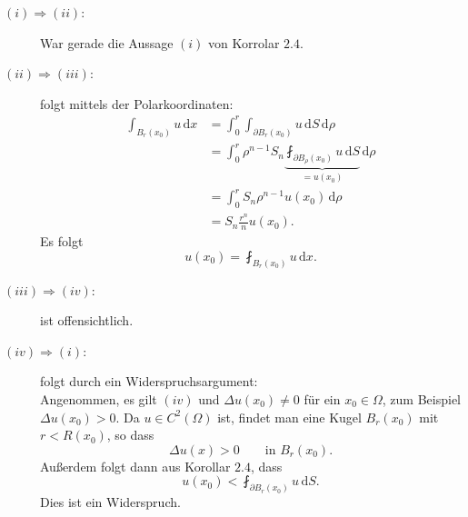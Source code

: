 \begin{beweis}
	\begin{description}
		\item[\underline{$(i) \Rightarrow (ii)$}:] War gerade die Aussage $(i)$ von Korrolar $2.4$.
		\item[\underline{$(ii) \Rightarrow (iii)$}:] folgt mittels der Polarkoordinaten:
		\begin{align*}
			\int_{B_r(x_0)}^{}u \,\mathrm{d}x &= \int_{0}^{r} \int_{\partial B_r(x_0)}^{} u \,\mathrm{d}S \,\mathrm{d}\rho  \\
			&= \int_{0}^{r} \rho^{n-1}S_n \underset{=u(x_0)}{\underbrace{\fint_{\partial B_{\rho}(x_0)}^{} u \,\mathrm{d}S}} \,\mathrm{d} \rho \\
			&= \int_{0}^{r}S_n \rho^{n-1} u(x_0)\,\mathrm{d}\rho \\
			&= S_n \frac{r^n}{n} u(x_0).
		\end{align*}
		Es folgt \[
			u(x_0) = \fint_{B_r(x_0)}^{} u \,\mathrm{d}x.
		\]
		\item[\underline{$(iii) \Rightarrow (iv)$}:] ist offensichtlich.
		\item[\underline{$(iv) \Rightarrow (i)$}:] folgt durch ein Widerspruchsargument: \\
		Angenommen, es gilt $(iv)$ und $\Delta u(x_0) \neq 0$ für ein $x_0 \in \Omega$, zum Beispiel $ \Delta u(x_0) > 0$. 
		Da $u \in C^2(\Omega)$ ist, findet man eine Kugel $B_r(x_0)$ mit $r < R(x_0)$, so dass
		\[
			\Delta u(x) > 0 \qquad \text{in } B_r(x_0).
		\]
		Außerdem folgt dann aus Korollar $2.4$, dass 
		\[
			u(x_0)< \fint_{\partial B_r(x_0)}^{} u \,\mathrm{d}S.
		\]
		Dies ist ein Widerspruch.
	\end{description}
\end{beweis}

